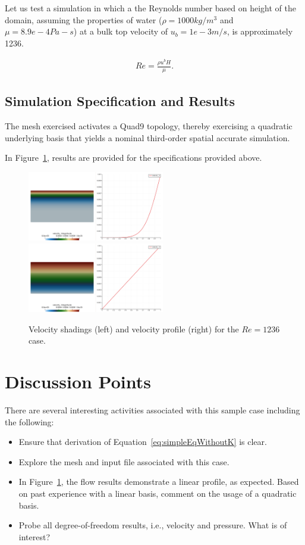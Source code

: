 \documentclass{article}
\begin{document}
Let us test a simulation in which a the Reynolds number based on height of the domain,
assuming the properties of water ($\rho = 1000 kg/m^3$ and $\mu = 8.9e-4 Pa-s$)
at a bulk top velocity of $u_b = 1e-3 m/s$, is approximately 1236.

\begin{align}
  Re = \frac{\rho u^b H}{\mu}.
\label{eq:muForm}
\end{align}

\subsection{Simulation Specification and Results}

The mesh exercised activates a Quad9 topology, thereby exercising a
quadratic underlying basis that yields a nominal third-order spatial accurate
simulation.

In Figure~\ref{fig:results}, results are provided for the specifications
provided above.

\begin{figure}[!htbp]
  \subfloat[]
  \centering
  {
   \includegraphics[height=1.2in]{images/2d_quad9_couette_results_early.png}
  }
  \subfloat[]
  \centering
  {
   \includegraphics[height=1.2in]{images/2d_quad9_couette_results_late.png}
  }
  \caption{Velocity shadings (left) and velocity profile (right) for the $Re = 1236$ case.}
  \label{fig:results}
\end{figure}

\section{Discussion Points}

There are several interesting activities associated with this sample case including
the following:

\begin{itemize}
	\item Ensure that derivation of Equation~\ref{eq:simpleEqWithoutK} is clear.
	\item Explore the mesh and input file associated with this case.
	\item In Figure~\ref{fig:results}, the flow results demonstrate a linear profile, as 
          expected. Based on past experience with a linear basis, comment on the usage of a quadratic
          basis.
        \item Probe all degree-of-freedom results, i.e., velocity and pressure. What is of interest?
\end{itemize}
\end{document}
